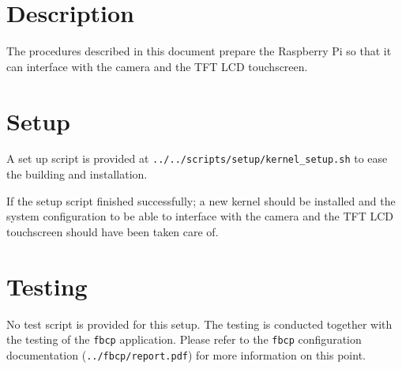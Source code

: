 \section{Description}
The procedures described in this document prepare the Raspberry Pi so that it
can interface with the camera and the TFT LCD touchscreen.

\section{Setup}
A set up script is provided at \texttt{../../scripts/setup/kernel\_setup.sh} to
ease the building and installation.

If the setup script finished successfully; a new kernel should be installed and
the system configuration to be able to interface with the camera and the TFT LCD
touchscreen should have been taken care of.

\section{Testing}
No test script is provided for this setup. The testing is conducted together
with the testing of the \texttt{fbcp} application. Please refer to the
\texttt{fbcp} configuration documentation (\texttt{../fbcp/report.pdf}) for
more information on this point.

